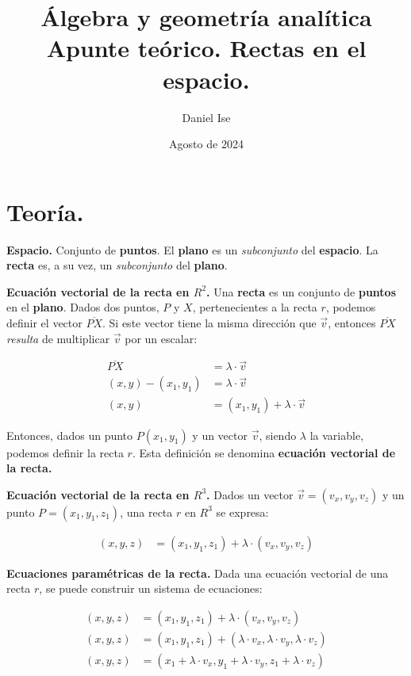 \documentclass{article}
\title{Álgebra y geometría analítica\\Apunte teórico. Rectas en el espacio.}
\author{Daniel Ise}
\date{Agosto de 2024}
\begin{document}
\maketitle

\section*{Teoría.}

\textbf{Espacio.} Conjunto de \textbf{puntos}. El \textbf{plano} es un
\textit{subconjunto} del \textbf{espacio}. La \textbf{recta} es, a su vez, un
\textit{subconjunto} del \textbf{plano}.

\textbf{Ecuación vectorial de la recta en \(R^2\).} Una \textbf{recta} es un
conjunto de \textbf{puntos} en el \textbf{plano}.
Dados dos puntos, $P$ y $X$, pertenecientes a la recta $r$,
podemos definir el vector \(\overline{PX}\).
Si este vector tiene la misma dirección que \(\vec{v}\),
entonces \(\overline{PX}\) \textit{resulta} de multiplicar \(\vec{v}\) por un
escalar:

\begin{align*}
    \overline{PX}     & = \lambda \cdot \vec{v}             \\
    (x,y) - (x_1,y_1) & = \lambda \cdot \vec{v}             \\
    (x,y)             & = (x_1,y_1) + \lambda \cdot \vec{v}
\end{align*}

Entonces, dados un punto $P (x_1,y_1)$ y un vector \(\vec{v}\),
siendo \(\lambda\) la variable, podemos definir la recta $r$.
Esta definición se denomina \textbf{ecuación vectorial de la recta.}

\textbf{Ecuación vectorial de la recta en \(R^3\).}
Dados un vector \(\vec{v} = (v_x,v_y,v_z)\) y un punto \(P = (x_1, y_1, z_1)\),
una recta \(r\) en \(R^3\) se expresa:

\begin{align*}
    (x, y, z) & = (x_1,y_1,z_1) + \lambda \cdot (v_x, v_y, v_z)
\end{align*}

\textbf{Ecuaciones paramétricas de la recta.}
Dada una ecuación vectorial de una recta \(r\),
se puede construir un sistema de ecuaciones:

\begin{align*}
    (x, y, z) & = (x_1,y_1,z_1) + \lambda \cdot (v_x, v_y, v_z)                               \\
    (x, y, z) & = (x_1,y_1,z_1) + (\lambda \cdot v_x, \lambda \cdot v_y,\lambda \cdot v_z)    \\
    (x, y, z) & = (x_1 + \lambda \cdot v_x, y_1 + \lambda \cdot v_y, z_1 + \lambda \cdot v_z)
\end{align*}
\end{document}

